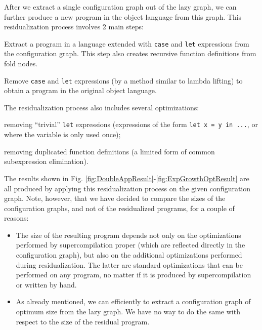 \documentclass[submission,copyright,creativecommons]{eptcs}
\begin{document}
After we extract a single configuration graph out of the lazy graph, we can further
produce a new program in the object language from this graph.
This residualization process involves 2 main steps:
  \begin{enumerate*}[label=\itshape\arabic*\upshape)]
    \item Extract a program in a language extended with \verb|case| and \verb|let| expressions from the configuration graph.
      This step also creates recursive function definitions from fold nodes.
    \item Remove \verb|case| and \verb|let| expressions (by a method similar to lambda lifting) to
      obtain a program in the original object language.
  \end{enumerate*}
The residualization process also includes several optimizations:
  \begin{enumerate*}[label=\itshape\alph*\upshape)]
    \item removing ``trivial'' \verb|let| expressions (expressions of the form \verb|let x = y in ...|, or where the variable is
      only used once);
    \item removing duplicated function definitions (a limited form of common subexpression elimination).
  \end{enumerate*}
The results shown in Fig. \ref{fig:DoubleAppResult}-\ref{fig:ExpGrowthOptResult} are all produced by applying
this residualization process on the given configuration graph.
Note, however, that we have decided to compare the sizes of the configuration graphs, and not of the residualized
programs, for a couple of reasons:
\begin{itemize}
  \item The size of the resulting program depends not only on the optimizations performed by supercompilation proper
    (which are reflected directly in the configuration graph), but also on the additional optimizations performed
    during residualization.
    The latter are standard optimizations that can be performed on any program, no matter if it is produced
    by supercompilation or written by hand.
  \item As already mentioned, we can efficiently to extract a configuration graph of optimum size from the lazy graph.
    We have no way to do the same with respect to the size of the residual program.
\end{itemize}
\end{document}
